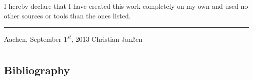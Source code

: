 \documentclass[final,twoside,11pt,titlepage,a4paper,english,bibliography=totocnumbered,listof=numbered]{scrbook}
\newcommand{\auth}{Christian Jan\ss en}
\begin{document}
I hereby declare that I have created this work completely on my own and used no other sources or tools than the ones listed.

\vspace{30 mm}

\begin{flushright}
	\rule{90mm}{1pt}

	Aachen, September $1^{st}$, 2013 \hspace{24 mm} \auth
\end{flushright}

%

%

\tableofcontents{}

\mainmatter

\part{}



\part{}


\part{}
%



\setwidesite{}

\begin{appendix} 

\addappheadtotoc

\chapter{Bibliography}
\label{cha:bibliography}
\printbibliography[heading=offline,filter=offline]
\printbibliography[heading=online,filter=online]






%

% 


\end{appendix}

\backmatter
\end{document}
